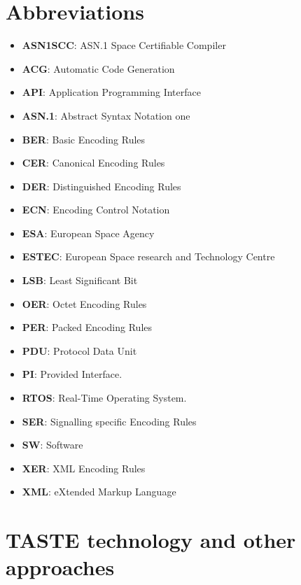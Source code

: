 \documentclass[11pt]{book}
\begin{document}
{\chapter{Abbreviations}
   \begin{itemize}
      \item
         \textbf{ASN1SCC}: ASN.1 Space Certifiable Compiler
      \item
         \textbf{ACG}: Automatic Code Generation
      \item
         \textbf{API}: Application Programming Interface
      \item
         \textbf{ASN.1}: Abstract Syntax Notation one
      \item
         \textbf{BER}: Basic Encoding Rules
      \item
         \textbf{CER}: Canonical Encoding Rules
      \item
         \textbf{DER}: Distinguished Encoding Rules
      \item
         \textbf{ECN}: Encoding Control Notation
      \item
         \textbf{ESA}: European Space Agency
      \item
         \textbf{ESTEC}: European Space research and Technology Centre
      \item
         \textbf{LSB}: Least Significant Bit
      \item
         \textbf{OER}: Octet Encoding Rules
      \item
         \textbf{PER}: Packed Encoding Rules
      \item
         \textbf{PDU}: Protocol Data Unit
      \item
         \textbf{PI}: Provided Interface.
      \item
         \textbf{RTOS}: Real-Time Operating System.

      \item
         \textbf{SER}: Signalling specific Encoding Rules
      \item
         \textbf{SW}: Software
      \item
         \textbf{XER}: XML Encoding Rules
      \item
         \textbf{XML}: eXtended Markup Language
   \end{itemize}


   \chapter{TASTE technology and other approaches}
}
\end{document}
